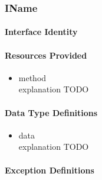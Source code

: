 \subsubsection{IName}
\paragraph{Interface Identity}
\paragraph{Resources Provided}
\begin{itemize}
	\item{method}\\
	explanation TODO
\end{itemize}
\paragraph{Data Type Definitions}
\begin{itemize}
	\item data\\
	explanation TODO
\end{itemize}
\paragraph{Exception Definitions}
